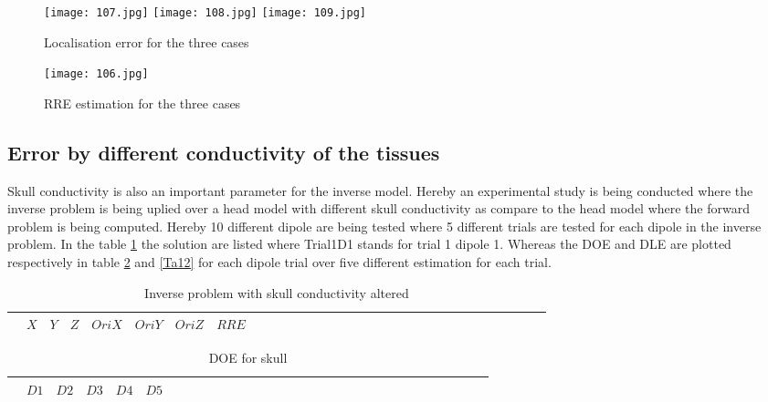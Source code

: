 \begin{figure}[!htbp]
%
\centering
\texttt{[image: 107.jpg]}
\label{EE2}
\endminipage\hfill
{}%
\centering
\texttt{[image: 108.jpg]}
\label{EE3}
\endminipage\hfill
{}%
\centering
\texttt{[image: 109.jpg]}
\label{EE4}
\endminipage\hfill
\caption{Localisation error for the three cases}\label{EEE}
\end{figure}

\begin{figure}[!htbp]
\centering
\texttt{[image: 106.jpg]}
\caption{RRE estimation for the three cases}\label{RRE2}
\end{figure}


\newpage
\subsection{Error by different conductivity of the tissues}

Skull conductivity is also an important parameter for the inverse model. Hereby an experimental study is being conducted where the inverse problem is being uplied over a head model with different skull conductivity as compare to the head model where the forward problem is being computed. Hereby 10 different dipole are being tested where 5 different trials are tested for each dipole in the inverse problem. In the table \ref{Ta1} the solution are listed where Trial1D1 stands for trial 1 dipole 1. Whereas the DOE and DLE are plotted respectively in table \ref{Ta11} and \ref{Ta12} for each dipole trial over five different estimation for each trial. 

 \begin{table}[!htbp]
\centering
\caption{Inverse problem with skull conductivity altered}\label{Ta1}
\begin{tabular}{c c c c c c c c c c c c c c c c c c c c c c c c c c c c c c c } 
\hline 
$ $&$X$&$Y$&$Z$&$OriX$&$OriY$&$OriZ$&$RRE$\\
\hline

\hline 
\end{tabular}
\end{table}


\begin{table}[!htbp]
\centering
\caption{DOE for skull}\label{Ta11}
\begin{tabular}{c c c c c c c c c c c c c c c c c c c c c c c c c c c c c c c }
\hline 
$ $&$D1$&$D2$&$D3$&$D4$&$D5$\\
\hline
 
\hline 
\end{tabular}
\end{table}

